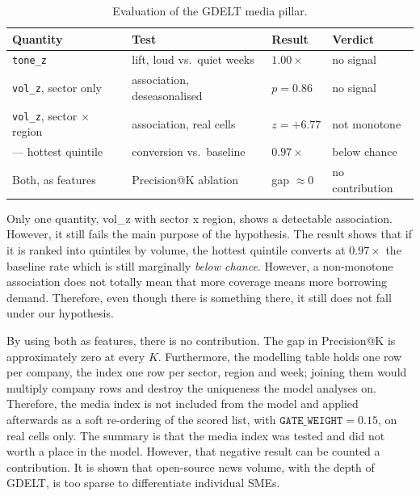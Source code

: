 \documentclass[ %
                    author={Natchalin Iwsakul \\ Inkaphol Siriwongwattana \\ Tanaphan Kummaraphat \\ Patorn Srisupap},
                supervisor={Fernando Moreno-Pino},
                    degree={MSc},
                     title={Propensity Modelling for SME Commercial Lending Using Open Public Data},
                  subtitle={Companies House filings and GDELT media coverage as predictors of first-time borrowing},
                      type={},
                      year={2026}]{dissertation}
\begin{document}
\begin{table}[h]
\centering\small
\begin{tabular}{@{}llll@{}}
\toprule
\textbf{Quantity} & \textbf{Test} & \textbf{Result} & \textbf{Verdict} \\
\midrule
\texttt{tone\_z} & lift, loud vs.\ quiet weeks & $1.00\times$ & no signal \\
\texttt{vol\_z}, sector only & association, deseasonalised & $p = 0.86$ & no signal \\
\texttt{vol\_z}, sector $\times$ region & association, real cells & $z = +6.77$ & not monotone \\
\quad --- hottest quintile & conversion vs.\ baseline & $0.97\times$ & below chance \\
Both, as features & Precision@K ablation & gap $\approx 0$ & no contribution \\
\bottomrule
\end{tabular}
\caption{Evaluation of the GDELT media pillar.}
\label{tab:media-eval}
\end{table}

Only one quantity, vol\_z with sector x region, shows a detectable association. However, it still fails the main purpose of the hypothesis. The result shows that if it is ranked into quintiles by volume, the hottest quintile converts at $0.97\times$ the baseline rate which is still marginally \textit{below chance}. However, a non-monotone association does not totally mean that more coverage means more borrowing demand. Therefore, even though there is something there, it still does not fall under our hypothesis.

By using both as features, there is no contribution. The gap in Precision@K is
approximately zero at every $K$. Furthermore, the modelling table holds
one row per company, the index one row per sector, region and week; joining them
would multiply company rows and destroy the uniqueness the model analyses on. Therefore, the
media index is not included from the model and applied afterwards as a
soft re-ordering of the scored list, with $\texttt{GATE\_WEIGHT} = 0.15$, on real cells only.
The summary is that the media index was tested and did not worth a place in the model. However, that negative result can be counted a contribution. It is shown that open-source news volume, with the depth of GDELT, is too sparse to differentiate individual SMEs.
\end{document}
